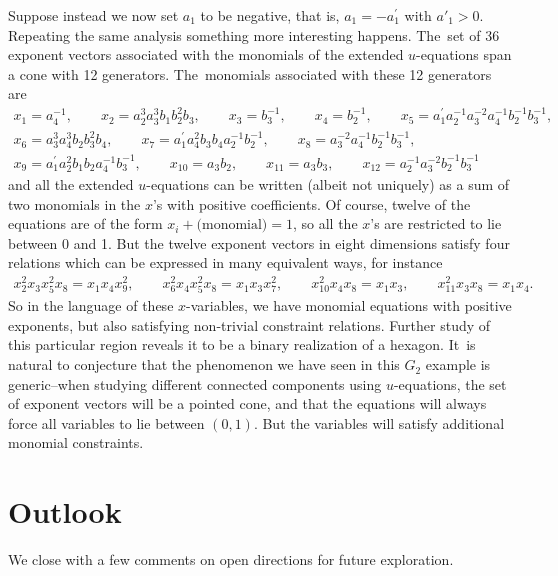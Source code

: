 \documentclass[10pt,a4paper]{amsart}
\numberwithin{equation}{section}
\begin{document}
Suppose instead we now set $a_1$ to be negative, that is, $a_1 = -a^\prime_1$ with $a'_1 >0$. Repeating the same analysis something more interesting happens. The~set of 36 exponent vectors associated with the monomials of the extended $u$-equations span a cone with 12 generators. The~monomials associated with these 12 generators are
\begin{gather*}
x_1 = a_4^{-1}, \qquad\!
x_2=a_2^3 a_3^3 b_1 b_2^2 b_3, \qquad
x_3=b_3^{-1},\qquad \!
x_4=b_2^{-1},\qquad \!
x_5=a^\prime_1 a_2^{-1}a_3^{-2} a_4^{-1} b_2^{-1} b_3^{-1},
\\
x_6 =a_3^3 a_4^3 b_2 b_3^2 b_4, \qquad
x_7 = a^\prime_1 a_4^2 b_3 b_4 a_2^{-1} b_2^{-1}, \qquad
x_8=a_3^{-2} a_4^{-1} b_2^{-1} b_3^{-1},
\\
x_{9} = a^\prime_1 a_2^2 b_1 b_2 a_4^{-1} b_3^{-1}, \qquad
x_{10}=a_3 b_2, \qquad
x_{11} = a_3 b_3, \qquad
x_{12} = a_2^{-1} a_3^{-2} b_2^{-1} b_3^{-1}
\end{gather*}
and all the extended $u$-equations can be written (albeit not uniquely) as a sum of two monomials in the $x$'s with positive coefficients. Of course, twelve of the equations are of the form $x_i + \text{(monomial)} = 1$, so all the $x$'s are restricted to lie between 0 and 1. But the twelve exponent vectors in eight dimensions satisfy four relations which can be expressed in many equivalent ways, for instance
\begin{gather*}
x_2^2 x_3 x_5^2 x_8=x_1 x_4 x_9^2, \qquad x_6^2 x_4 x_5^2 x_8 = x_1 x_3 x_7^2, \qquad x_{10}^2 x_4 x_8 = x_1 x_3, \qquad x_{11}^2 x_3 x_8 = x_1 x_4.
\end{gather*}
So in the language of these $x$-variables, we have monomial equations with positive exponents, but also satisfying non-trivial constraint relations. Further study of this particular region reveals it to be a binary realization of a hexagon. It~is natural to conjecture that the phenomenon we have seen in this $G_2$ example is generic--when studying different connected components using $u$-equations, the set of exponent vectors will be a pointed cone, and that the equations will always force all variables to lie between $(0,1)$. But the variables will satisfy additional monomial constraints.

\section{Outlook}

We close with a few comments on open directions for future exploration.
\end{document}
